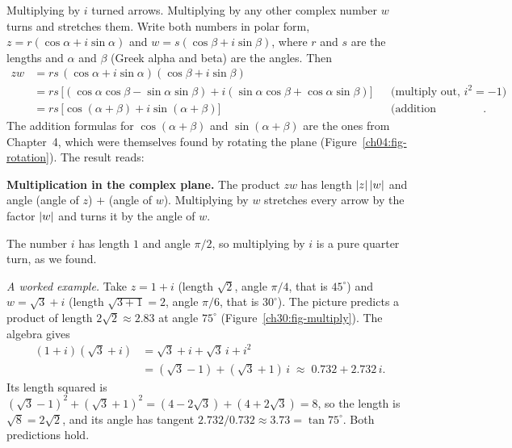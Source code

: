 Multiplying by $i$ turned arrows. Multiplying by any other complex number $w$ turns and stretches them. Write both numbers in polar form, $z = r(\cos\alpha + i\sin\alpha)$ and $w = s(\cos\beta + i\sin\beta)$, where $r$ and $s$ are the lengths and $\alpha$ and $\beta$ (Greek alpha and beta) are the angles. Then
\begin{align*}
  zw &= rs\,(\cos\alpha + i\sin\alpha)(\cos\beta + i\sin\beta)\\
     &= rs\,\bigl[(\cos\alpha\cos\beta - \sin\alpha\sin\beta) + i(\sin\alpha\cos\beta + \cos\alpha\sin\beta)\bigr]
       && \text{(multiply out, $i^2=-1$)}\\
     &= rs\,\bigl[\cos(\alpha+\beta) + i\sin(\alpha+\beta)\bigr]
       && \text{(addition formulas)}.
\end{align*}
The addition formulas for $\cos(\alpha+\beta)$ and $\sin(\alpha+\beta)$ are the ones from Chapter~4, which were themselves found by rotating the plane (Figure~\ref{ch04:fig-rotation}). The result reads:
\begin{focusbox}
\textbf{Multiplication in the complex plane.} The product $zw$ has length $\lvert z\rvert\,\lvert w\rvert$ and angle (angle of $z$) $+$ (angle of $w$). Multiplying by $w$ stretches every arrow by the factor $\lvert w\rvert$ and turns it by the angle of $w$.
\end{focusbox}
The number $i$ has length $1$ and angle $\pi/2$, so multiplying by $i$ is a pure quarter turn, as we found.

\emph{A worked example.} Take $z = 1 + i$ (length $\sqrt2$, angle $\pi/4$, that is $45^\circ$) and $w = \sqrt3 + i$ (length $\sqrt{3+1} = 2$, angle $\pi/6$, that is $30^\circ$). The picture predicts a product of length $2\sqrt2 \approx 2.83$ at angle $75^\circ$ (Figure~\ref{ch30:fig-multiply}). The algebra gives
\begin{align*}
  (1+i)(\sqrt3 + i) &= \sqrt3 + i + \sqrt3\, i + i^2 \\
                    &= (\sqrt3 - 1) + (\sqrt3 + 1)\,i \;\approx\; 0.732 + 2.732\,i.
\end{align*}
Its length squared is $(\sqrt3-1)^2 + (\sqrt3+1)^2 = (4 - 2\sqrt3) + (4 + 2\sqrt3) = 8$, so the length is $\sqrt8 = 2\sqrt2$, and its angle has tangent $2.732/0.732 \approx 3.73 = \tan 75^\circ$. Both predictions hold.

